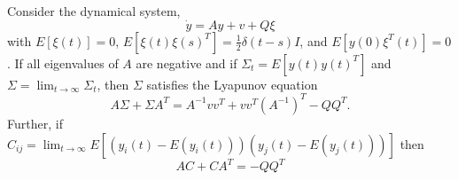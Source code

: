 \documentclass{article}
\begin{document}
\begin{claim} \label{lyapeq_derivation}
Consider the dynamical system,
\begin{equation}
\dot{y}=Ay+v+Q\xi  \label{tofindsigma}
\end{equation}
with $E[\xi(t)]=0$, $E[\xi(t)\xi(s)^T]=\frac{1}{2}\delta(t-s)I$, and $E[y(0)\xi^T(t)]=0$. If all eigenvalues of $A$ are negative and if $\Sigma_t=E[y(t)y(t)^T]$ and $\Sigma=\lim_{t\to\infty}\Sigma_t$, then $\Sigma$ satisfies the Lyapunov equation
\begin{equation*}
A\Sigma+\Sigma A^T=A^{-1}vv^T+vv^T(A^{-1})^T-QQ^T.
\end{equation*}
Further, if $C_{ij}=\lim_{t\to\infty} E[(y_i(t)-E(y_i(t)))(y_j(t)-E(y_j(t)))]$ then 
\begin{equation*}
AC+CA^T=-QQ^T
\end{equation*}
\end{claim}
\end{document}
